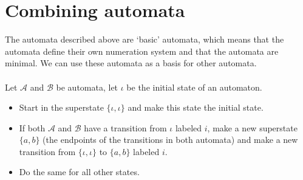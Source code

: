 \documentclass{article}
\theoremstyle{definition}
\begin{document}
\section{Combining automata}
The automata described above are `basic' automata, which means that the 
automata define their own numeration system and that the automata are minimal.
We can use these automata as a basis for other automata.\\
\\
Let $\mathcal{A}$ and $\mathcal{B}$ be automata, let $\iota$ be the initial
state of an automaton.
\begin{itemize}
\item Start in the superstate $\{\iota, \iota\}$ and make this state the 
      initial state.
\item If both $\mathcal{A}$ and $\mathcal{B}$ have a transition from $\iota$ 
      labeled $i$, make a new superstate $\{a, b\}$ (the endpoints of the 
      transitions in both automata) and make a new transition from 
      $\{\iota, \iota\}$ to $\{a, b\}$ labeled $i$.
\item Do the same for all other states.
\end{itemize}
\end{document}
